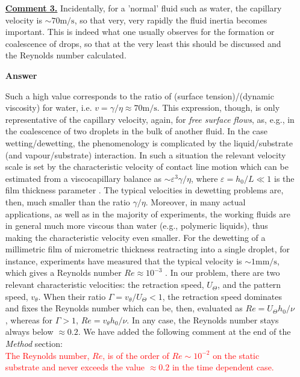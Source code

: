 \documentclass[12pt,english]{article}
\begin{document}
\begin{itemize}
{}

\item[ \textbf{\underline{Comment 3.}}]
{ 
Incidentally, for a 'normal' fluid such as water, the capillary velocity is $\sim 70\mbox{m}/\mbox{s}$, 
so that very, very rapidly the fluid inertia becomes important. 
This is indeed what one usually observes for the formation or coalescence of drops, so that at the very least this should be discussed and the Reynolds number calculated.
}

\item[ \textbf{{Answer}}]
{
Such a high value corresponds to the ratio of (surface tension)/(dynamic viscosity) for water, i.e. $v = \gamma/\eta \approx 70 \mbox{m}/\mbox{s}$.
This expression, though, is only representative of the capillary velocity, again, for {\it free surface flows}, as, e.g., in the coalescence of 
two droplets in the bulk of another fluid. 
In the case wetting/dewetting, 
the phenomenology is complicated by the liquid/substrate (and vapour/substrate) interaction. 
In such a situation the relevant velocity scale is set by the characteristic velocity of contact line 
motion which can be estimated from a viscocapillary balance as 
$\sim \varepsilon^3 \gamma/\eta$, where $\varepsilon = h_0/L \ll 1$ is the film thickness parameter 
\cite{RevModPhys.69.931,doi:10.1146/annurev-fluid-011212-140734}. 
The typical velocities in dewetting problems are, then, much smaller than the ratio $\gamma/\eta$.
Moreover, in many actual applications, as well as in the majority of experiments, the 
working fluids are in general much more viscous than water (e.g., polymeric liquids), thus making
the characteristic velocity even smaller.
For the dewetting of a millimetric film of micrometric thickness reatracting into a single droplet, for instance, experiments have measured that 
the typical velocity is $\sim 1 \mbox{mm}/\mbox{s}$, which gives a Reynolds number $Re \approx 10^{-3}$ \cite{Edwards2016}. 
In our problem, there are two relevant characteristic velocities: the retraction speed, 
$U_{\Theta}$, and 
the pattern speed, $v_{\theta}$. When their ratio $\Gamma = v_{\theta}/U_{\Theta} < 1$, the retraction speed dominates and fixes the Reynolds number which can be, then, evaluated as 
$Re = U_{\Theta}h_0/\nu$ \cite{RevModPhys.69.931}, whereas for $\Gamma > 1$, $Re = v_{\theta} h_0/\nu$. 
In any case, the Reynolds number stays always below $\approx 0.2$.
We have added the following comment at the end of the {\it Method} section:\\

\textcolor{red}{The Reynolds number, $Re$, is of the order of $Re \sim 10^{-2}$ on the 
static substrate and never exceeds the value $\approx 0.2$ in the time dependent case.}

}
\end{itemize}
\end{document}
